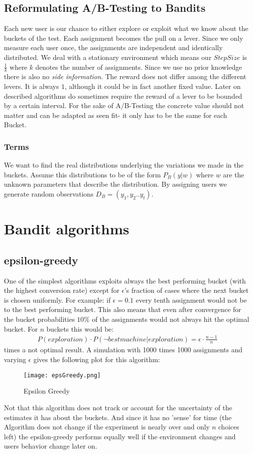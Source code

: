 \documentclass[main.tex]{subfiles}
\begin{document}
\subsection{Reformulating A/B-Testing to Bandits}
Each new user is our chance to either explore or exploit what we know about the buckets of the test. Each assignment becomes the pull on a lever. Since we only measure each user once, the assignments are independent and identically distributed. We deal with a stationary environment which means our $StepSize$ is $\frac{1}{k}$ where $k$ denotes the number of assignments. Since we use no prior knowledge there is also no \emph{side information}. The reward does not differ among the different levers. It is always $1$, although it could be in fact another fixed value. Later on described algorithms do sometimes require the reward of a lever to be bounded by a certain interval. For the sake of A/B-Testing the concrete value should not matter and can be adapted as seen fit- it only has to be the same for each Bucket. 
\subsubsection{Terms}
We want to find the real distributions underlying the variations we made in the buckets. Assume this distributions to be of the form $P_B(y|w)$ where $w$ are the unknown parameters that describe the distribution. By assigning users we generate random observations $D_B=(y_1,y_2..y_t)$.

\section{Bandit algorithms}
\subsection{epsilon-greedy}
One of the simplest algorithms exploits always the best performing bucket (with the highest conversion rate) except for $\epsilon $'s fraction of cases where the next bucket is chosen uniformly. For example: if $\epsilon = 0.1$ every tenth assignment would not be to the best performing bucket. This also means that even after convergence for the bucket probabilities $10\%$ of the assignments would not always hit the optimal bucket. For $n$ buckets this would be:
\begin{align*}
P(exploration) \cdot P(\neg best machine | exploration) = \epsilon \cdot \frac{n-1}{n}
\end{align*}
times a not optimal result. A simulation with 1000 times 1000 assignments and varying $\epsilon$ gives the following plot for this algorithm:
\begin{figure}[ht]
\texttt{[image: epsGreedy.png]}
\centering
\caption{Epsilon Greedy}
\label{fig:EpsGreedy}
\end{figure}
Not that this algorithm does not track or account for the uncertainty of the estimates it has about the buckets. And since it has no 'sense' for time (the Algorithm does not change if the experiment is nearly over and only $n$ choices left) the epsilon-greedy performs equally well if the environment changes and users behavior change later on.
\end{document}
